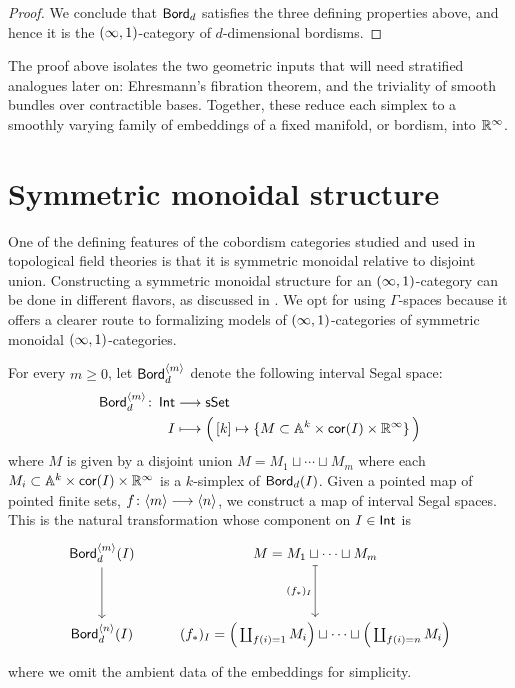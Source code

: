 \begin{proof}
    We conclude that $\operatorname{\mathsf{Bord}}_d$ satisfies the three defining properties above, and hence it is the $(\operatorname{\infty},1)$-category of $d$-dimensional bordisms.
\end{proof}

\begin{remark}
    The proof above isolates the two geometric inputs that will need stratified analogues later on: Ehresmann's fibration theorem, and the triviality of smooth bundles over contractible bases. Together, these reduce each simplex to a smoothly varying family of embeddings of a fixed manifold, or bordism, into $\mathbb R^\infty$.
\end{remark}








\section{Symmetric monoidal structure}

One of the defining features of the cobordism categories studied and used in topological field theories is that it is symmetric monoidal relative to disjoint union. Constructing a symmetric monoidal structure for an $(\operatorname{\infty},1)$-category can be done in different flavors, as discussed in . We opt for using $\Gamma$-spaces because it offers a clearer route to formalizing models of $(\operatorname{\infty},1)$-categories of symmetric monoidal $(\operatorname{\infty},1)$-categories.


\begin{construction}\label{ch3:: cons: Gamma-space}
  For every $m\geq 0$, let $\operatorname{\mathsf{Bord}}_d^{\langle m \rangle}$ denote the following interval Segal space:
\begin{align}
    \operatorname{\mathsf{Bord}}_d^{\langle m \rangle} \colon \operatorname{\mathsf{Int}} &\longrightarrow \operatorname{\sf sSet} \\
    I &\longmapsto \Big(\,[k] \mapsto \{M \subset \mathbb A^{k}\times \mathsf{cor}(I)\times \mathbb R^{\operatorname{\infty}}\}\,\Big)
\end{align} 
where $M$ is given by a disjoint union $M = M_{1} \sqcup \cdots \sqcup M_{m}$ where each $M_{i}\subset \mathbb A^{k} \times \mathsf{cor}(I)\times \mathbb R^{\operatorname{\infty}}$ is a $k$-simplex of $\operatorname{\mathsf{Bord}}_d(I)$. Given a pointed map of pointed finite sets, $f\colon \langle m \rangle \longrightarrow \langle n \rangle$, we construct a map of interval Segal spaces. This is the natural transformation whose component on $I \in \operatorname{\mathsf{Int}}$ is
\begin{equation}
    \begin{tikzcd}
        {\bord_d^{\langle m \rangle }(I)} & {M = M_1 \sqcup \cdots \sqcup M_m} \\
        \\
        {\bord_d^{\langle n \rangle }(I)} & {(f_*)_I = \Big(\coprod_{f(i) = 1}M_i\Big) \sqcup \cdots \sqcup \Big(\coprod_{f(i) = n}M_i\Big)}
        \arrow[from=1-1, to=3-1]
        \arrow["{{(f_*)_I}}"', maps to, from=1-2, to=3-2]
    \end{tikzcd}
\end{equation}
where we omit the ambient data of the embeddings for simplicity.
\end{construction}

